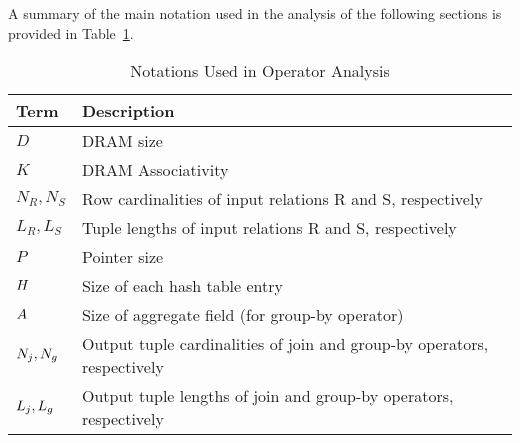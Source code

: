 A summary of the main notation used in the analysis of the following
sections is provided in Table~\ref{tab:notations}.

\begin{table}[t]
\centering
\caption{Notations Used in Operator Analysis}
\label{tab:notations}
\begin{small}
\begin{tabular}{p{2cm}p{11cm}}
\toprule  
\textbf{Term} & \textbf{Description}\\ 
\midrule
\textbf{$D$} & DRAM size\\
\textbf{$K$} & DRAM Associativity\\
\textbf{$N_R, N_S$} & Row cardinalities of input relations R and S, respectively\\
\textbf{$L_R, L_S$} & Tuple lengths of input relations R and S, respectively\\
\textbf{$P$} & Pointer size\\
\textbf{$H$} & Size of each hash table entry\\
\textbf{$A$} & Size of aggregate field (for group-by operator)\\
\textbf{$N_j,N_g$} & Output tuple cardinalities of join and group-by operators, respectively\\
\textbf{$L_j,L_g$} & Output tuple lengths of join and group-by operators, respectively\\
\bottomrule
\end{tabular}
\end{small}
\end{table}
